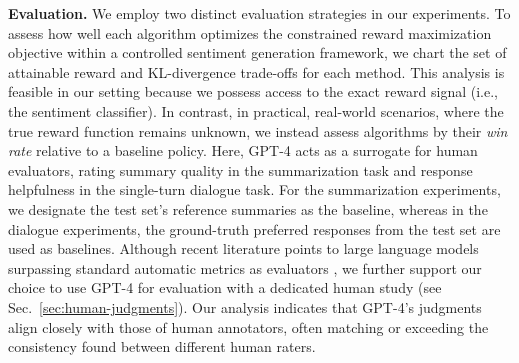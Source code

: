 \textbf{Evaluation.} We employ two distinct evaluation strategies in our experiments. To assess how well each algorithm optimizes the constrained reward maximization objective within a controlled sentiment generation framework, we chart the set of attainable reward and KL-divergence trade-offs for each method. This analysis is feasible in our setting because we possess access to the exact reward signal (i.e., the sentiment classifier). In contrast, in practical, real-world scenarios, where the true reward function remains unknown, we instead assess algorithms by their \textit{win rate} relative to a baseline policy. Here, GPT-4 acts as a surrogate for human evaluators, rating summary quality in the summarization task and response helpfulness in the single-turn dialogue task. For the summarization experiments, we designate the test set’s reference summaries as the baseline, whereas in the dialogue experiments, the ground-truth preferred responses from the test set are used as baselines. Although recent literature points to large language models surpassing standard automatic metrics as evaluators \citep{Chen2023ExploringTU}, we further support our choice to use GPT-4 for evaluation with a dedicated human study (see Sec.~\ref{sec:human-judgments}). Our analysis indicates that GPT-4’s judgments align closely with those of human annotators, often matching or exceeding the consistency found between different human raters.

